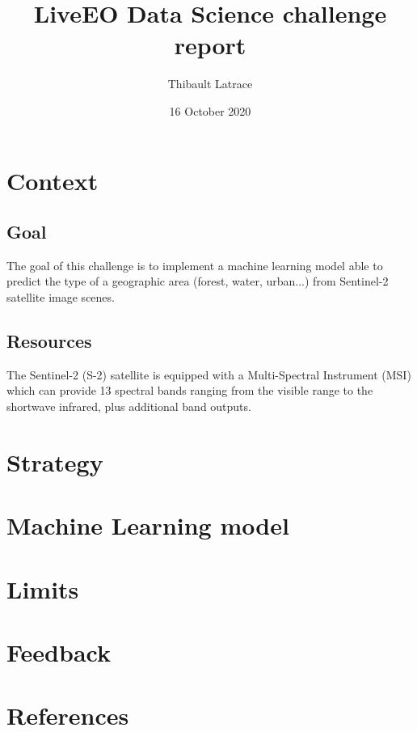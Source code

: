 \documentclass{article}
\title{LiveEO Data Science challenge report}
\author{Thibault Latrace }
\date{16 October 2020}
\begin{document}
\maketitle


\section{Context}

\subsection{Goal}

The goal of this challenge is to implement a machine learning model able to predict the type of a geographic area (forest, water, urban...) from Sentinel-2 satellite image scenes.

\subsection{Resources}

The Sentinel-2 (S-2) satellite is equipped with a Multi-Spectral Instrument (MSI) which can provide 13 spectral bands ranging from the visible range to the shortwave infrared, plus additional band outputs.


\section{Strategy}


\section{Machine Learning model}

\section{Limits}

\section{Feedback}

\section{References}
\end{document}
